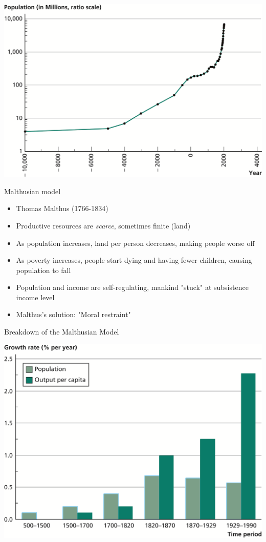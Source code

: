 \documentclass[10pt]{beamer}
\begin{document}
\begin{frame}[label={sec:orgfb88509}]{}
\begin{center}
\includegraphics[width=.75\textwidth]{./img/4.2.png}
\end{center}
\end{frame}

\begin{frame}[label={sec:orgf530d5d}]{}
\alert{Malthusian model}
\begin{itemize}
\item Thomas Malthus (1766-1834)
\item Productive resources are \emph{scarce}, sometimes finite (land)
\item As population increases, land per person decreases, making people worse off
\item As poverty increases, people start dying and having fewer children, causing population to fall
\item Population and income are self-regulating, mankind "stuck" at subsistence income level
\item Malthus's solution: "Moral restraint"
\end{itemize}
\end{frame}

\begin{frame}[label={sec:org2b3aa1b}]{Breakdown of the Malthusian Model}
\begin{center}
\includegraphics[width=.75\textwidth]{./img/4.6.png}
\end{center}
\end{frame}
\end{document}
